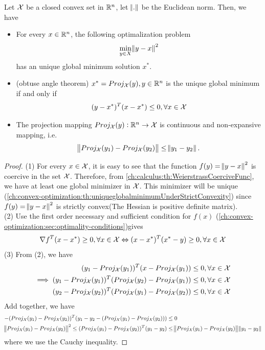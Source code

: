 \begin{refsection}
\begin{theorem}\cite[19]{bertsekas2016nonlinear}\label{ch:convex-analysis:th:projectionconvexset}
Let $\mathcal{X}$ be a closed convex set in $\mathbb{R}^n$, let $\norm{.}$ be the Euclidean norm. Then, we have
\begin{itemize}
	\item For every $x\in \mathbb{R}^n$, the following optimalization problem
	$$\min_{y\in X}\norm{y-x}^2$$
	has an unique global minimum solution $x^*$.
	\item (obtuse angle theorem) $x^* = Proj_{\mathcal{X}}(y), y\in\mathbb{R}^n$ is the unique global minimum if and 
	only if $$(y-x^*)^T(x-x^*) \leq 0,\forall x\in \mathcal{X}$$
	\item The projection mapping $Proj_{\mathcal{X}}(y):\mathbb{R}^n\to \mathcal{X}$ is continuous and non-expansive mapping, i.e. 
	$$\norm{Proj_{\mathcal{X}}(y_1)-Proj_{\mathcal{X}} (y_2)} \leq \norm{y_1-y_2}.$$
\end{itemize}
\end{theorem}
\begin{proof}
(1) For every $x\in \mathcal{X}$, it is easy to see that the function $f(y) = \norm{y-x}^2$ is coercive in the set $\mathcal{X}$. Therefore, from \autoref{ch:calculus:th:WeierstrassCoerciveFunc}, we have at least one global minimizer in $\mathcal{X}$. This minimizer will be unique (\autoref{ch:convex-optimization:th:uniqueglobalminimumUnderStrictConvexity}) since $f(y) = \norm{y-x}^2$ is strictly convex(The Hessian is positive definite matrix). \\
(2) Use the first order necessary and sufficient condition for $f(x)$ (\autoref{ch:convex-optimization:sec:optimality-conditions})gives
$$\nabla f^T(x-x^*) \geq 0,\forall x\in \mathcal{X} \Leftrightarrow (x-x^*)^T(x^*-y) \geq 0,\forall x\in \mathcal{X}$$
(3) 
From (2), we have
\begin{align*}
(y_1 - Proj_{\mathcal{X}}(y_1))^T(x - Proj_{\mathcal{X}}(y_1))&\leq 0,\forall x\in \mathcal{X} \\
\implies
(y_1 - Proj_{\mathcal{X}}(y_1))^T(Proj_{\mathcal{X}}(y_2) - Proj_{\mathcal{X}}(y_1))&\leq 0,\forall x\in \mathcal{X} \\
(y_2 - Proj_{\mathcal{X}}(y_2))^T(Proj_{\mathcal{X}}(y_1) - Proj_{\mathcal{X}}(y_2))&\leq 0,\forall x\in \mathcal{X}
\end{align*}
Add together, we have
\begin{align*}
-(Proj_{\mathcal{X}}(y_1) - Proj_{\mathcal{X}}(y_2))^T(y_1 - y_2 - (Proj_{\mathcal{X}}(y_1) - Proj_{\mathcal{X}}(y_2)))&\leq 0 \\
\norm{Proj_{\mathcal{X}}(y_1)-Proj_{\mathcal{X}} (y_2)}^2 \leq (Proj_{\mathcal{X}}(y_1) - Proj_{\mathcal{X}}(y_2))^T(y_1-y_2) &\leq  \norm{Proj_{\mathcal{X}}(y_1)-Proj_{\mathcal{X}} (y_2)}\norm{y_1-y_2}
\end{align*}
where we use the Cauchy inequality.


\end{proof}
\end{refsection}
